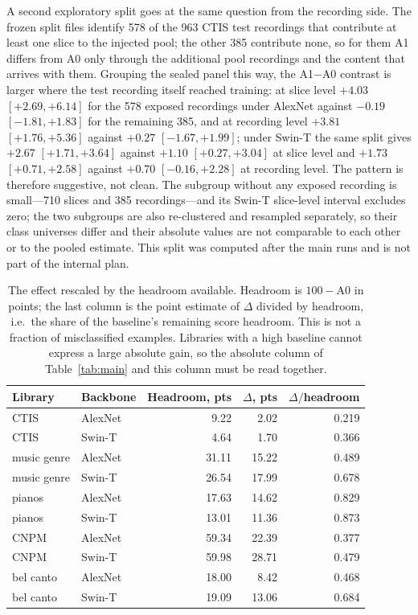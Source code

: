 A second exploratory split goes at the same question from the recording side. The frozen split
files identify 578 of the 963 CTIS test recordings that contribute at least one slice to the
injected pool; the other 385 contribute none, so for them A1 differs from A0 only through the
additional pool recordings and the content that arrives with them. Grouping the sealed panel this
way, the A1$-$A0 contrast is larger where the test recording itself reached training: at slice
level $+4.03$ $[+2.69,+6.14]$ for the 578 exposed recordings under AlexNet against $-0.19$
$[-1.81,+1.83]$ for the remaining 385, and at recording level $+3.81$ $[+1.76,+5.36]$ against
$+0.27$ $[-1.67,+1.99]$; under Swin-T the same split gives $+2.67$ $[+1.71,+3.64]$ against
$+1.10$ $[+0.27,+3.04]$ at slice level and $+1.73$ $[+0.71,+2.58]$ against $+0.70$
$[-0.16,+2.28]$ at recording level. The pattern is therefore suggestive, not clean. The subgroup without any exposed
recording is small---710 slices and 385 recordings---and its Swin-T slice-level interval
excludes zero; the two subgroups are also re-clustered and resampled
separately, so their class universes differ and their absolute values are not comparable to each
other or to the pooled estimate. This split was computed after the main runs and is not part of the
internal plan.

\begin{table}[t]
\centering
\caption{The effect rescaled by the headroom available. Headroom is $100 - \mathrm{A0}$ in
points; the last column is the point estimate of $\Delta$ divided by headroom, i.e.\ the share of
the baseline's remaining score headroom. This is not a fraction of misclassified examples. Libraries with a high baseline cannot
express a large absolute gain, so the absolute column of Table~\ref{tab:main} and this column
must be read together.}
\label{tab:headroom}
\small
\begin{tabular}{llrrr}
\toprule
Library & Backbone & Headroom, pts & $\Delta$, pts & $\Delta/$headroom \\
\midrule
CTIS        & AlexNet &  9.22 &  2.02 & 0.219 \\
CTIS        & Swin-T  &  4.64 &  1.70 & 0.366 \\
music genre & AlexNet & 31.11 & 15.22 & 0.489 \\
music genre & Swin-T  & 26.54 & 17.99 & 0.678 \\
pianos      & AlexNet & 17.63 & 14.62 & 0.829 \\
pianos      & Swin-T  & 13.01 & 11.36 & 0.873 \\
CNPM        & AlexNet & 59.34 & 22.39 & 0.377 \\
CNPM        & Swin-T  & 59.98 & 28.71 & 0.479 \\
bel canto  & AlexNet & 18.00 &  8.42 & 0.468 \\
bel canto  & Swin-T  & 19.09 & 13.06 & 0.684 \\
\bottomrule
\end{tabular}
\end{table}

